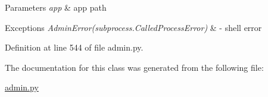 \begin{DoxyParams}{Parameters}
{\em app} & app path \\
\hline
\end{DoxyParams}

\begin{DoxyExceptions}{Exceptions}
{\em Admin\-Error(subprocess.\-Called\-Process\-Error)} & -\/ shell error \\
\hline
\end{DoxyExceptions}


Definition at line 544 of file admin.\-py.



The documentation for this class was generated from the following file\-:\begin{DoxyCompactItemize}
\item 
\hyperlink{admin_8py}{admin.\-py}\end{DoxyCompactItemize}
